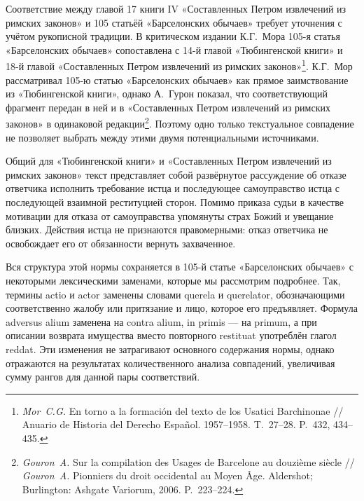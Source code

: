 Соответствие между главой 17 книги IV «Составленных Петром извлечений из римских законов» и 105 статьёй «Барселонских обычаев» требует уточнения с учётом рукописной традиции. В критическом издании К.Г.~Мора 105-я статья «Барселонских обычаев» сопоставлена с 14-й главой «Тюбингенской книги» и 18-й главой «Составленных Петром извлечений из римских законов»\footnote{\emph{Mor~C.G. }En torno a la formación del texto de los Usatici Barchinonae // Anuario de Historia del Derecho Español. 1957--1958. T.~27--28. P.~432, 434--435.}. К.Г.~Мор рассматривал 105-ю статью «Барселонских обычаев» как прямое заимствование из «Тюбингенской книги», однако А.~Гурон показал, что соответствующий фрагмент передан в ней и в «Составленных Петром извлечений из римских законов» в одинаковой редакции\footnote{\emph{Gouron~A. }Sur la compilation des Usages de Barcelone au douzième siècle // \emph{Gouron}\emph{~}\emph{A. }Pionniers du droit occidental au Moyen Âge. Aldershot; Burlington: Ashgate Variorum, 2006. P.~223--224.}. Поэтому одно только текстуальное совпадение не позволяет выбрать между этими двумя потенциальными источниками.

Общий для «Тюбингенской книги» и «Составленных Петром извлечений из римских законов» текст представляет собой развёрнутое рассуждение об отказе ответчика исполнить требование истца и последующее самоуправство истца с последующей взаимной реституцией сторон. Помимо приказа судьи в качестве мотивации для отказа от самоуправства упомянуты страх Божий и увещание близких. Действия истца не признаются правомерными: отказ ответчика не освобождает его от обязанности вернуть захваченное.

Вся структура этой нормы сохраняется в 105-й статье «Барселонских обычаев» с некоторыми лексическими заменами, которые мы рассмотрим подробнее. Так, термины actio и actor заменены словами querela и querelator, обозначающими соответственно жалобу или притязание и лицо, которое его предъявляет. Формула adversus alium заменена на contra alium, in primis --- на primum, а при описании возврата имущества вместо повторного restituat употреблён глагол reddat. Эти изменения не затрагивают основного содержания нормы, однако отражаются на результатах количественного анализа совпадений, увеличивая сумму рангов для данной пары соответствий.

